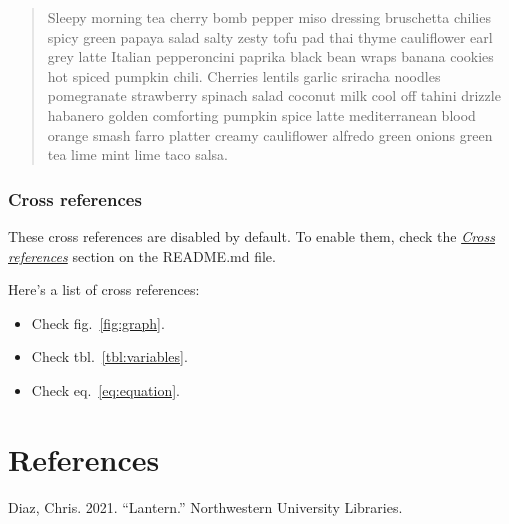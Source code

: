 \documentclass{book}
\providecommand{\tightlist}{%
  \setlength{\itemsep}{0pt}\setlength{\parskip}{0pt}}
\newlength{\cslhangindent}
\newlength{\cslentryspacingunit} %
\newenvironment{CSLReferences}[2] %
 {%
  \setlength{\parindent}{0pt}
  \ifodd #1
  \let\oldpar\par
  \def\par{\hangindent=\cslhangindent\oldpar}
  \fi
  \setlength{\parskip}{#2\cslentryspacingunit}
 }%
 {}
\begin{document}
\begin{quote}
Sleepy morning tea cherry bomb pepper miso dressing bruschetta chilies spicy
green papaya salad salty zesty tofu pad thai thyme cauliflower earl grey latte
Italian pepperoncini paprika black bean wraps banana cookies hot spiced
pumpkin chili. Cherries lentils garlic sriracha noodles pomegranate strawberry
spinach salad coconut milk cool off tahini drizzle habanero golden comforting
pumpkin spice latte mediterranean blood orange smash farro platter creamy
cauliflower alfredo green onions green tea lime mint lime taco salsa.
\end{quote}

\hypertarget{cross-references}{%
\subsection{Cross references}\label{cross-references}}

These cross references are disabled by default. To enable them, check the
\emph{\href{https://github.com/wikiti/pandoc-book-template\#cross-references}{Cross
references}} section on the README.md file.

Here's a list of cross references:

\begin{itemize}
\tightlist
\item
  Check fig.~\ref{fig:graph}.
\item
  Check tbl.~\ref{tbl:variables}.
\item
  Check eq.~\ref{eq:equation}.
\end{itemize}

\hypertarget{bibliography}{%
\chapter*{References}\label{bibliography}}

\hypertarget{refs}{}
\begin{CSLReferences}{1}{0}
\leavevmode{}%
Diaz, Chris. 2021. {``Lantern.''} Northwestern University Libraries.

\end{CSLReferences}

\backmatter
\end{document}
